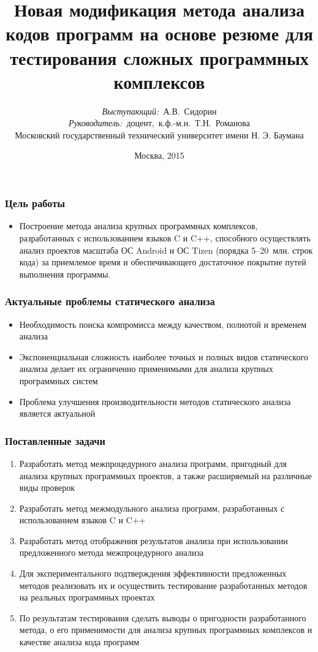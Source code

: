 \documentclass[14pt]{beamer}
\title{\small{Новая модификация метода анализа кодов программ на основе резюме для тестирования сложных программных комплексов}}
\author{\small{%
\emph{Выступающий:}~А.В.~Сидорин\\%
\emph{Руководитель:}~доцент,~к.ф.-м.н.~Т.Н.~Романова}\\%
\vspace{30pt}%
Московский государственный технический университет имени Н. Э. Баумана%
\vspace{20pt}%
}
\date{\small{Москва, 2015}}
\begin{document}
\maketitle

\begin{frame}
\frametitle{Цель работы}
\begin{itemize}
  \item Построение метода анализа крупных программных комплексов, разработанных с использованием языков C и C++, способного осуществлять анализ проектов масштаба ОС Android и ОС Tizen (порядка 5--20~млн. строк кода) за приемлемое время и обеспечивающего достаточное покрытие путей выполнения программы.
\end{itemize}
\end{frame}

\begin{frame}
\frametitle{Актуальные проблемы статического анализа}
\begin{itemize}
  \item Необходимость поиска компромисса между качеством, полнотой и временем анализа
  \item Экспоненциальная сложность наиболее точных и полных видов статического анализа делает их ограниченно применимыми для анализа крупных программных систем
  \item Проблема улучшения производительности методов статического анализа является актуальной   
\end{itemize}
\end{frame}

\begin{frame}[allowframebreaks]
\frametitle{Поставленные задачи}
\begin{enumerate}
  \item Разработать метод межпроцедурного анализа программ, пригодный для анализа крупных программных проектов, а также расширяемый на различные виды проверок
  \item Разработать метод межмодульного анализа программ, разработанных с использованием языков C и C++
  \item Разработать метод отображения результатов анализа при использовании предложенного метода межпроцедурного анализа
  \item Для экспериментального подтверждения эффективности предложенных методов реализовать их и осуществить тестирование разработанных методов на реальных программных проектах
  \item По результатам тестирования сделать выводы о пригодности разработанного метода, о его применимости для анализа крупных программных комплексов и качестве анализа кода программ
\end{enumerate}
\end{frame}
\end{document}
